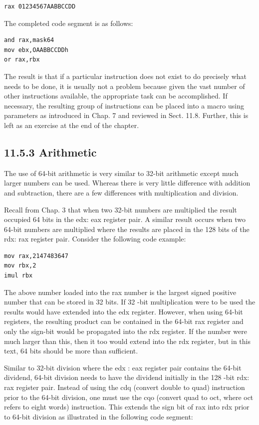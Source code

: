 \documentclass[10pt]{article}
\begin{document}
\begin{verbatim}
rax 01234567AABBCCDD
\end{verbatim}

The completed code segment is as follows:

\begin{verbatim}
and rax,mask64
mov ebx,OAABBCCDDh
or rax,rbx
\end{verbatim}

The result is that if a particular instruction does not exist to do precisely what needs to be done, it is usually not a problem because given the vast number of other instructions available, the appropriate task can be accomplished. If necessary, the resulting group of instructions can be placed into a macro using parameters as introduced in Chap. 7 and reviewed in Sect. 11.8. Further, this is left as an exercise at the end of the chapter.

\subsection*{11.5.3 Arithmetic}
The use of 64-bit arithmetic is very similar to 32-bit arithmetic except much larger numbers can be used. Whereas there is very little difference with addition and subtraction, there are a few differences with multiplication and division.

Recall from Chap. 3 that when two 32-bit numbers are multiplied the result occupied 64 bits in the edx: eax register pair. A similar result occurs when two 64-bit numbers are multiplied where the results are placed in the 128 bits of the rdx: rax register pair. Consider the following code example:

\begin{verbatim}
mov rax,2147483647
mov rbx,2
imul rbx
\end{verbatim}

The above number loaded into the rax number is the largest signed positive number that can be stored in 32 bits. If 32 -bit multiplication were to be used the results would have extended into the edx register. However, when using 64-bit registers, the resulting product can be contained in the 64-bit rax register and only the sign-bit would be propagated into the rdx register. If the number were much larger than this, then it too would extend into the rdx register, but in this text, 64 bits should be more than sufficient.

Similar to 32-bit division where the edx : eax register pair contains the 64-bit dividend, 64-bit division needs to have the dividend initially in the 128 -bit rdx:\\
rax register pair. Instead of using the cdq (convert double to quad) instruction prior to the 64-bit division, one must use the cqo (convert quad to oct, where oct refers to eight words) instruction. This extends the sign bit of rax into rdx prior to 64-bit division as illustrated in the following code segment:
\end{document}
